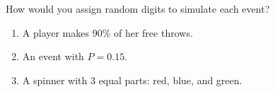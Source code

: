 \documentclass[11pt]{article}
\begin{document}
\begin{enumerate}[resume]
\begin{enumerate}
  \work{2.5em}
\end{enumerate}

\vspace{0.4em}
How would you assign random digits to simulate each event?
\begin{enumerate}[start=6]
  \item A player makes 90\% of her free throws. 
  \work{2.5em}
  \item An event with $P = 0.15$. 
  \work{2.5em}
  \item A spinner with 3 equal parts: red, blue, and green.

  \work{2.5em}
\end{enumerate}

\end{enumerate}
\end{document}
